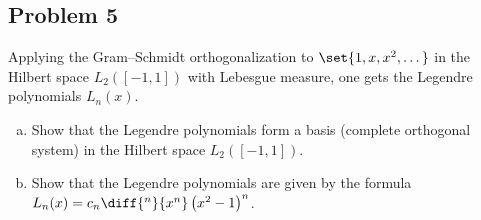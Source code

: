\documentclass[10pt]{mypackage}
\begin{document}
\subsection{Problem 5}%
\begin{problem}
  Applying the Gram--Schmidt orthogonalization to $\set{1,x,x^2,\dots}$ in the Hilbert space $L_2\left( [-1,1] \right)$ with Lebesgue measure, one gets the Legendre polynomials $L_n(x)$.
  \begin{enumerate}[(a)]
    \item Show that the Legendre polynomials form a basis (complete orthogonal system) in the Hilbert space $L_2\left( [-1,1] \right)$.
    \item Show that the Legendre polynomials are given by the formula $L_n(x) = c_n \diff{^{n}}{x^{n}} \left( x^2-1 \right)^{n}$.
  \end{enumerate}
\end{problem}
\end{document}
